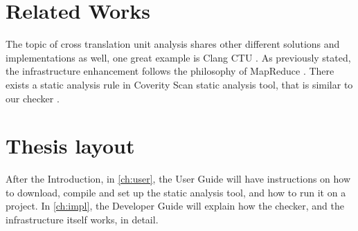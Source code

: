 \section{Related Works}

The topic of cross translation unit analysis shares other different solutions and implementations as well, one great example is
Clang CTU \cite{clangCTU}.
As previously stated, the infrastructure enhancement follows the philosophy of MapReduce \cite{mapreduce}.
There exists a static analysis rule in Coverity Scan static analysis tool, that is similar to our checker \cite{coverity}.


\section{Thesis layout}

After the Introduction, in \cref{ch:user}, the User Guide will have instructions on how to download, compile and set up the static analysis tool, and
how to run it on a \CC{} project. In \cref{ch:impl}, the Developer Guide will explain how the checker, and the infrastructure itself works, in detail.
